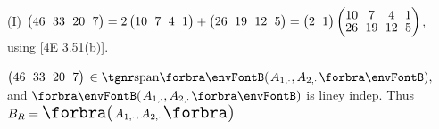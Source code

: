 (I) {\normalsize$\begin{pmatrix} 46 &\hspace{-4pt} 33 &\hspace{-4pt} 20 &\hspace{-4pt} 7 \end{pmatrix}=2\begin{pmatrix} 10 &\hspace{-4pt} 7 &\hspace{-4pt} 4 &\hspace{-4pt} 1\end{pmatrix}+\begin{pmatrix} 26 &\hspace{-4pt} 19 &\hspace{-4pt} 12 &\hspace{-4pt} 5\end{pmatrix}=\begin{pmatrix}2 &\hspace{-4pt} 1\end{pmatrix}\begin{pmatrix} 10 &\hspace{-4pt} 7 &\hspace{-4pt} 4 &\hspace{-4pt} 1\\[-2pt] 26 &\hspace{-4pt} 19 &\hspace{-4pt} 12 &\hspace{-4pt} 5\end{pmatrix}$}, using [4E 3.51(b)].\vspace{3pt}\par\quad\HI
{\small$\begin{pmatrix} 46 &\hspace{-4pt} 33 &\hspace{-4pt} 20 &\hspace{-4pt} 7 \end{pmatrix}$}${}\in\Span{A_{1,\cdot},A_{2,\cdot}},$ and $\Par{A_{1,\cdot},A_{2,\cdot}}$ is liney indep. Thus $B_R=\BigPar{A_{1,\cdot},A_{2,\cdot}}.$\par\vspace{6pt}\quad\EndI
